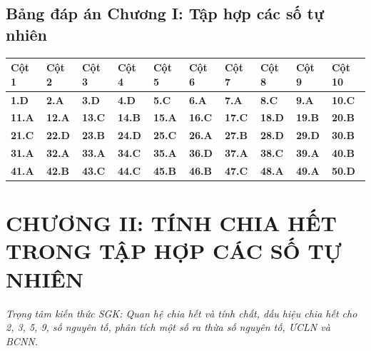 \documentclass[11pt,a4paper]{article}
\begin{document}
\subsection*{\color{primary} Bảng đáp án Chương I: Tập hợp các số tự nhiên}
\begin{center}
\renewcommand{\arraystretch}{1.25}
\begin{tabularx}{\textwidth}{*{10}{>{\centering\arraybackslash}X}}
\toprule
\textbf{\color{primary} Cột 1} & \textbf{\color{primary} Cột 2} & \textbf{\color{primary} Cột 3} & \textbf{\color{primary} Cột 4} & \textbf{\color{primary} Cột 5} & \textbf{\color{primary} Cột 6} & \textbf{\color{primary} Cột 7} & \textbf{\color{primary} Cột 8} & \textbf{\color{primary} Cột 9} & \textbf{\color{primary} Cột 10} \\
\midrule
\textbf{1.D} & \textbf{2.A} & \textbf{3.D} & \textbf{4.D} & \textbf{5.C} & \textbf{6.A} & \textbf{7.A} & \textbf{8.C} & \textbf{9.A} & \textbf{10.C} \\
\rowcolor{rowtint} \textbf{11.A} & \textbf{12.A} & \textbf{13.C} & \textbf{14.B} & \textbf{15.A} & \textbf{16.C} & \textbf{17.C} & \textbf{18.D} & \textbf{19.B} & \textbf{20.B} \\
\textbf{21.C} & \textbf{22.D} & \textbf{23.B} & \textbf{24.D} & \textbf{25.C} & \textbf{26.A} & \textbf{27.B} & \textbf{28.D} & \textbf{29.D} & \textbf{30.B} \\
\rowcolor{rowtint} \textbf{31.A} & \textbf{32.A} & \textbf{33.A} & \textbf{34.C} & \textbf{35.A} & \textbf{36.D} & \textbf{37.A} & \textbf{38.C} & \textbf{39.A} & \textbf{40.B} \\
\textbf{41.A} & \textbf{42.B} & \textbf{43.C} & \textbf{44.C} & \textbf{45.B} & \textbf{46.B} & \textbf{47.C} & \textbf{48.A} & \textbf{49.A} & \textbf{50.D} \\
\bottomrule
\end{tabularx}
\end{center}\vspace{10pt}
\section*{\color{primary} CHƯƠNG II: TÍNH CHIA HẾT TRONG TẬP HỢP CÁC SỐ TỰ NHIÊN}
\textit{Trọng tâm kiến thức SGK: Quan hệ chia hết và tính chất, dấu hiệu chia hết cho 2, 3, 5, 9, số nguyên tố, phân tích một số ra thừa số nguyên tố, ƯCLN và BCNN.}\par\vspace{4pt}
\end{document}

